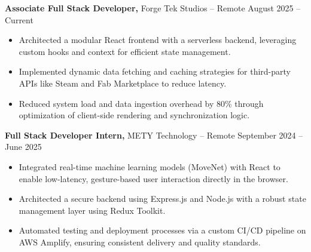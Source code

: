 \documentclass[11pt]{article}       %
\begin{document}
\textbf{Associate Full Stack Developer,} {Forge Tek Studios} -- Remote \hfill August 2025 -- Current 
\vspace{-9pt}
\begin{itemize}
  \item Architected a modular React frontend with a serverless backend, leveraging custom hooks and context for efficient state management.
  \item Implemented dynamic data fetching and caching strategies for third-party APIs like Steam and Fab Marketplace to reduce latency.
  \item Reduced system load and data ingestion overhead by 80\% through optimization of client-side rendering and synchronization logic.
\end{itemize}

\textbf{Full Stack Developer Intern,} {METY Technology} -- Remote \hfill September 2024 -- June 2025 
\vspace{-9pt}
\begin{itemize}
  \item Integrated real-time machine learning models (MoveNet) with React to enable low-latency, gesture-based user interaction directly in the browser.
  \item Architected a secure backend using Express.js and Node.js with a robust state management layer using Redux Toolkit.
  \item Automated testing and deployment processes via a custom CI/CD pipeline on AWS Amplify, ensuring consistent delivery and quality standards.
\end{itemize}

\end{document}
